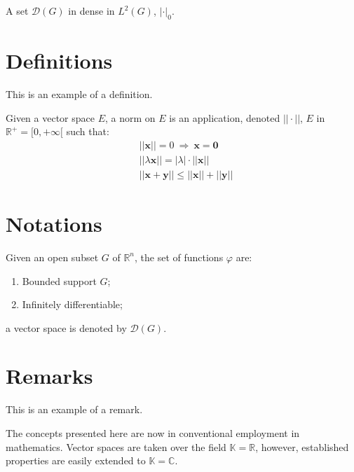 \documentclass[11pt,twoside]{book} %
\begin{document}
\begin{theorem}
    A set $\mathcal{D}(G)$ in dense in $L^2(G)$, $|\cdot|_0$.
\end{theorem}


\section{Definitions}

This is an example of a definition.

\begin{definition}
    Given a vector space $E$, a norm on $E$ is an application, denoted $||\cdot||$, $E$ in $\mathbb{R}^+=[0,+\infty[$ such that:
    \begin{align}
         & ||\mathbf{x}||=0\ \Rightarrow\ \mathbf{x}=\mathbf{0}        \\
         & ||\lambda \mathbf{x}||=|\lambda|\cdot ||\mathbf{x}||        \\
         & ||\mathbf{x}+\mathbf{y}||\leq ||\mathbf{x}||+||\mathbf{y}||
    \end{align}
\end{definition}


\section{Notations}

\begin{notation}
    Given an open subset $G$ of $\mathbb{R}^n$, the set of functions $\varphi$ are:
    \begin{enumerate}
        \item Bounded support $G$;
        \item Infinitely differentiable;
    \end{enumerate}
    a vector space is denoted by $\mathcal{D}(G)$.
\end{notation}


\section{Remarks}

This is an example of a remark.

\begin{remark}
    The concepts presented here are now in conventional employment in mathematics. Vector spaces are taken over the field $\mathbb{K}=\mathbb{R}$, however, established properties are easily extended to $\mathbb{K}=\mathbb{C}$.
\end{remark}
\end{document}
